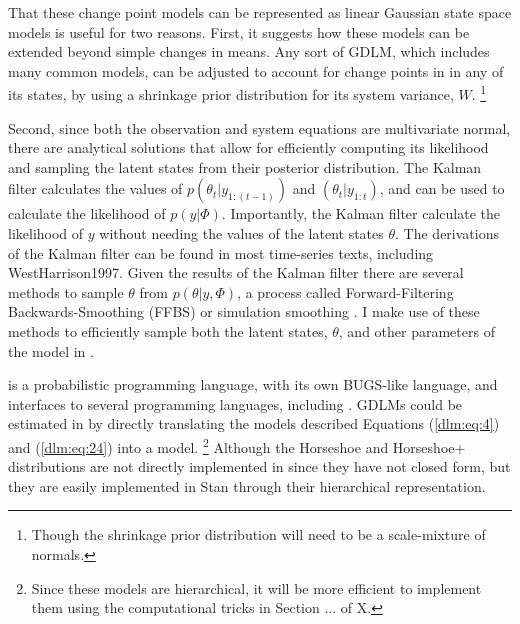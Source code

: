 That these change point models can be represented as linear Gaussian state space models is useful for two reasons.
First, it suggests how these models can be extended beyond simple changes in means.
Any sort of GDLM, which includes many common models, can be adjusted to account for change points in in any of its states, by using a shrinkage prior distribution for its system variance, $W$.%
\footnote{Though the shrinkage prior distribution will need to be a scale-mixture of normals.}

Second, since both the observation and system equations are multivariate normal, there are analytical solutions that allow for efficiently computing its likelihood and sampling the latent states from their posterior distribution.
The Kalman filter calculates the values of $p(\theta_{t} | y_{1:(t-1)})$  and $(\theta_{t}| y_{1:t})$, and can be used to calculate the likelihood of $p(y | \Phi)$.
Importantly, the Kalman filter calculate the likelihood of $y$ without needing the values of the latent states $\theta$.
The derivations of the Kalman filter can be found in most time-series texts, including \textcite[Ch. 5--7]{DurbinKoopman2012}{WestHarrison1997}.
Given the results of the Kalman filter there are several methods to sample $\theta$ from $p(\theta | y, \Phi)$, a process called Forward-Filtering Backwards-Smoothing (FFBS) or simulation smoothing \parencites{CarterKohn1994}{Fruehwirth-Schnatter1994}{DeJongShephard1995}{DurbinKoopman2002}[Ch 4.9]{DurbinKoopman2012}.
I make use of these methods to efficiently sample both the latent states, $\theta$, and other parameters of the model in \Stan{}.

\Stan{} is a probabilistic programming language, with its own BUGS-like language, and interfaces to several programming languages, including \RLang{} \parencites{Stan2015a}{CarpenterGelmanHoffmanEtAl2015a}.
GDLMs could be estimated in \Stan{} by directly translating the models described Equations (\ref{dlm:eq:4}) and (\ref{dlm:eq:24}) into a \Stan{} model.%
\footnote{Since these models are hierarchical, it will be more efficient to implement them using the computational tricks in Section ... of X.}
Although the Horseshoe and Horseshoe+ distributions are not directly implemented in \Stan{} since they have not closed form, but they are easily implemented in Stan through their hierarchical representation.

